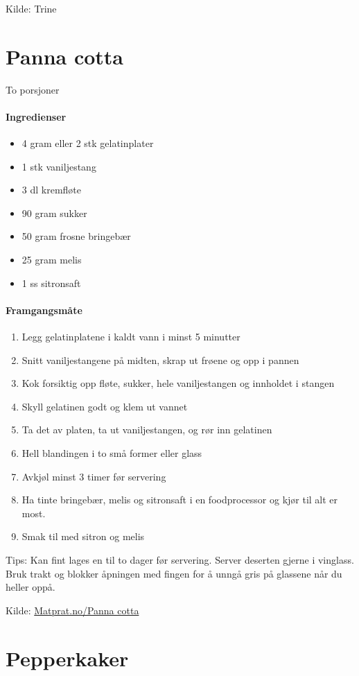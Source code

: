 \documentclass[12pt,a4paper]{book}
\begin{document}
{Kilde: Trine
\clearpage{}
\clearpage{}\section{﻿Panna cotta}
\label{pannacotta}
To porsjoner

\paragraph{Ingredienser}
\begin{itemize}[noitemsep]
	\item 4 gram eller 2 stk gelatinplater
	\item 1 stk vaniljestang
	\item 3 dl kremfløte
	\item 90 gram sukker
	\item 50 gram frosne bringebær
	\item 25 gram melis
	\item 1 ss sitronsaft
\end{itemize}

\paragraph{Framgangsmåte}
\begin{enumerate}[noitemsep]
	\item Legg gelatinplatene i kaldt vann i minst 5 minutter
	\item Snitt vaniljestangene på midten, skrap ut frøene og opp i pannen
	\item Kok forsiktig opp fløte, sukker, hele vaniljestangen og innholdet i stangen
	\item Skyll gelatinen godt og klem ut vannet
	\item Ta det av platen, ta ut vaniljestangen, og rør inn gelatinen
	\item Hell blandingen i to små former eller glass
	\item Avkjøl minst 3 timer før servering
	\item Ha tinte bringebær, melis og sitronsaft i en foodprocessor og kjør til alt er most.
	\item Smak til med sitron og melis
\end{enumerate}

Tips: Kan fint lages en til to dager før servering. Server deserten gjerne i vinglass. Bruk trakt og blokker åpningen med fingen for å unngå gris på glassene når du heller oppå.

Kilde: \href{http://www.matprat.no/gjester/gjesteoppskrifter/panna-cotta/}{Matprat.no/Panna cotta}
\clearpage{}
\clearpage{}\section{﻿Pepperkaker}


}
\end{document}
